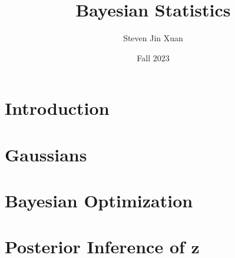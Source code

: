 \documentclass{article}[10, letterpaper]
\author{Steven Jin Xuan}
\date{Fall 2023}
\title{Bayesian Statistics}
\begin{document}

\section{Introduction}

\section{Gaussians}





\section{Bayesian Optimization}


\section{Posterior Inference of $\mathbf{z}$}


{}

\end{document}
